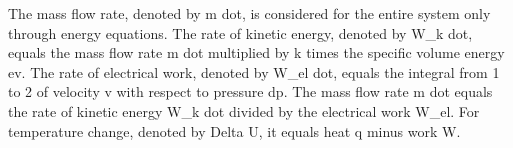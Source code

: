 The mass flow rate, denoted by m dot, is considered for the entire system only through energy equations. The rate of kinetic energy, denoted by W_k dot, equals the mass flow rate m dot multiplied by k times the specific volume energy ev. The rate of electrical work, denoted by W_el dot, equals the integral from 1 to 2 of velocity v with respect to pressure dp. The mass flow rate m dot equals the rate of kinetic energy W_k dot divided by the electrical work W_el. For temperature change, denoted by Delta U, it equals heat q minus work W.